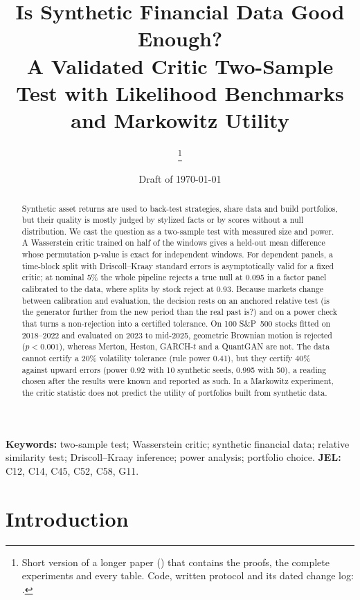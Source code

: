 \documentclass[11pt,a4paper]{article}
\title{Is Synthetic Financial Data Good Enough?\\[0.3em]
  \large A Validated Critic Two-Sample Test with Likelihood Benchmarks and Markowitz Utility}
\author{\todo{Author names and affiliations}\thanks{Short version of a longer paper
  (\todo{reference}) that contains the proofs, the complete experiments and every table.
  Code, written protocol and its dated change log: \todo{repository URL}.}}
\date{Draft of \today}
\theoremstyle{plain}
\begin{document}
\maketitle

\begin{abstract}
\noindent Synthetic asset returns are used to back-test strategies, share data and build
portfolios, but their quality is mostly judged by stylized facts or by scores without a null
distribution. We cast the question as a two-sample test with measured size and power. A
Wasserstein critic trained on half of the windows gives a held-out mean difference whose
permutation p-value is exact for independent windows. For dependent panels, a time-block split with
Driscoll--Kraay standard errors is asymptotically valid for a fixed critic; at nominal 5\% the whole
pipeline rejects a true null at 0.095 in a factor panel calibrated to the data, where splits by
stock reject at 0.93. Because markets change between
calibration and evaluation, the decision rests on an anchored relative test (is the generator
further from the new period than the real past is?) and on a power check that turns a
non-rejection into a certified tolerance. On 100 S\&P~500 stocks fitted on 2018--2022 and evaluated
on 2023 to mid-2025, geometric Brownian motion is rejected ($p<0.001$), whereas Merton, Heston,
GARCH-$t$ and a QuantGAN are not. The data cannot certify a 20\% volatility tolerance (rule power
0.41), but they certify 40\% against upward errors (power 0.92 with 10 synthetic seeds, 0.995 with
50), a reading chosen after the results were known and reported as such. In a Markowitz experiment,
the critic statistic does not predict the utility of portfolios built from synthetic data.
\end{abstract}

\noindent\textbf{Keywords:} two-sample test; Wasserstein critic; synthetic financial data;
relative similarity test; Driscoll--Kraay inference; power analysis; portfolio choice.
\textbf{JEL:} C12, C14, C45, C52, C58, G11.

\section{Introduction}\label{sec:intro}
\end{document}
